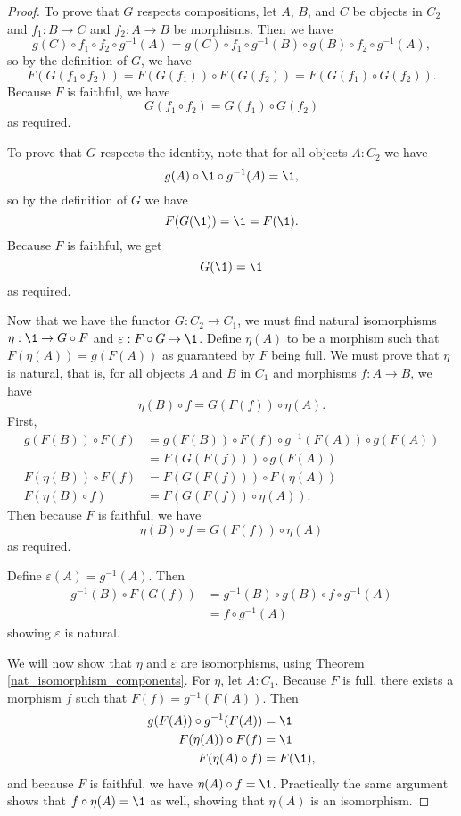 \documentclass[../../math.tex]{subfiles}
\begin{document}
\begin{proof}
    To prove that $G$ respects compositions, let $A$, $B$, and $C$ be objects in
    $C_2$ and $f_1 : B \to C$ and $f_2 : A \to B$ be morphisms.  Then we have
    \[
        g(C) \circ f_1 \circ f_2 \circ g^{-1}(A) = g(C) \circ f_1 \circ g^{-1}(B) \circ
        g(B) \circ f_2 \circ g^{-1}(A),
    \]
    so by the definition of $G$, we have
    \[
        F(G(f_1 \circ f_2)) = F(G(f_1)) \circ F(G(f_2))
        = F(G(f_1) \circ G(f_2)).
    \]
    Because $F$ is faithful, we have
    \[
        G(f_1 \circ f_2) = G(f_1) \circ G(f_2)
    \]
    as required.

    To prove that $G$ respects the identity, note that for all objects $A : C_2$
    we have
    \[
        g(A) \circ \1 \circ g^{-1}(A) = \1,
    \]
    so by the definition of $G$ we have
    \[
        F(G(\1)) = \1 = F(\1).
    \]
    Because $F$ is faithful, we get
    \[
        G(\1) = \1
    \]
    as required.

    Now that we have the functor $G : C_2 \to C_1$, we must find natural
    isomorphisms $\eta : \1 \to G \circ F$ and $\varepsilon : F \circ G \to \1$.
    Define $\eta(A)$ to be a morphism such that $F(\eta(A)) = g(F(A))$ as
    guaranteed by $F$ being full.  We must prove that $\eta$ is natural, that
    is, for all objects $A$ and $B$ in $C_1$ and morphisms $f : A \to B$, we
    have
    \[
        \eta(B) \circ f = G(F(f)) \circ \eta(A).
    \]
    First,
    \begin{align*}
        g(F(B)) \circ F(f)
            &= g(F(B)) \circ F(f) \circ g^{-1}(F(A)) \circ g(F(A)) \\
                           &= F(G(F(f))) \circ g(F(A)) \\
        F(\eta(B)) \circ F(f) &= F(G(F(f))) \circ F(\eta(A)) \\
        F(\eta(B) \circ f) &= F(G(F(f)) \circ \eta(A)).
    \end{align*}
    Then because $F$ is faithful, we have
    \[
        \eta(B) \circ f = G(F(f)) \circ \eta(A)
    \]
    as required.

    Define $\varepsilon(A) = g^{-1}(A)$.  Then
    \begin{align*}
        g^{-1}(B) \circ F(G(f))
        &= g^{-1}(B) \circ g(B) \circ f \circ g^{-1}(A) \\
        &= f \circ g^{-1}(A)
    \end{align*}
    showing $\varepsilon$ is natural.

    We will now show that $\eta$ and $\varepsilon$ are isomorphisms, using
    Theorem \ref{nat_isomorphism_components}.  For $\eta$, let $A : C_1$.
    Because $F$ is full, there exists a morphism $f$ such that $F(f) =
    g^{-1}(F(A))$.  Then
    \begin{align*}
        g(F(A)) \circ g^{-1}(F(A)) &= \1 \\
        F(\eta(A)) \circ F(f) &= \1 \\
        F(\eta(A) \circ f) &= F(\1),
    \end{align*}
    and because $F$ is faithful, we have $\eta(A) \circ f = \1$.  Practically
    the same argument shows that $f \circ \eta(A) = \1$ as well, showing that
    $\eta(A)$ is an isomorphism.


\end{proof}
\end{document}
